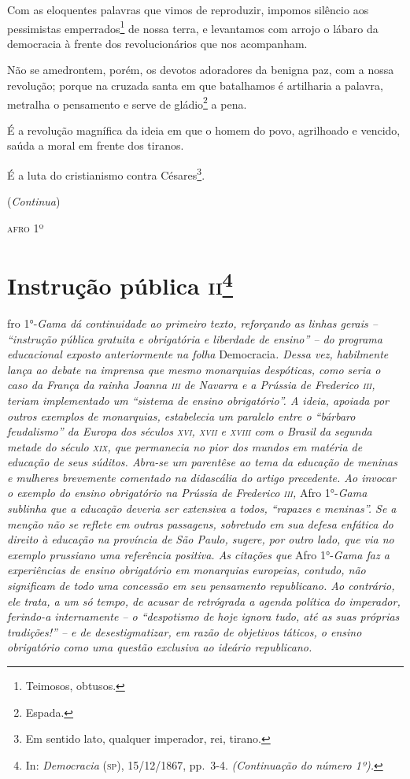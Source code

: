Com as eloquentes palavras que vimos de reproduzir, impomos silêncio aos
pessimistas emperrados\footnote{Teimosos, obtusos.} de nossa terra, e
levantamos com arrojo o lábaro da democracia à frente dos
revolucionários que nos acompanham.

Não se amedrontem, porém, os devotos adoradores da benigna paz, com a
nossa revolução; porque na cruzada santa em que batalhamos é artilharia
a palavra, metralha o pensamento e serve de gládio\footnote{Espada.} a
pena.

É a revolução magnífica da ideia em que o homem do povo, agrilhoado e
vencido, saúda a moral em frente dos tiranos.

É a luta do cristianismo contra Césares\footnote{Em sentido lato,
  qualquer imperador, rei, tirano.}.

(\emph{Continua})
\begin{flushright}
\textsc{afro} 1º
\end{flushright}
\chapter{Instrução pública \textsc{ii}\footnote{In: \emph{Democracia} (\textsc{sp}),
  15/12/1867, pp.~3-4. \emph{(Continuação do número 1º).}}}

\begin{didascalia}
fro 1°-\emph{Gama dá continuidade ao primeiro texto, reforçando as
linhas gerais -- ``instrução pública gratuita e obrigatória e liberdade
de ensino'' -- do programa educacional exposto anteriormente na folha}
Democracia\emph{. Dessa vez, habilmente lança ao debate na imprensa que
mesmo monarquias despóticas, como seria o caso da França da rainha
Joanna \textsc{iii} de Navarra e a Prússia de Frederico \textsc{iii}, teriam implementado
um ``sistema de ensino obrigatório''. A ideia, apoiada por outros exemplos
de monarquias, estabelecia um paralelo entre o ``bárbaro feudalismo'' da
Europa dos séculos \textsc{xvi}, \textsc{xvii} e \textsc{xviii} com o Brasil da segunda metade do
século \textsc{xix}, que permanecia no pior dos mundos em matéria de educação de
seus súditos. Abra-se um parentêse ao tema da educação de meninas e
mulheres brevemente comentado na didascália do artigo precedente. Ao
invocar o exemplo do ensino obrigatório na Prússia de Frederico \textsc{iii},}
Afro 1°-\emph{Gama sublinha que a educação deveria ser extensiva a
todos, ``rapazes e meninas''. Se a menção não se reflete em outras
passagens, sobretudo em sua defesa enfática do direito à educação na
província de São Paulo, sugere, por outro lado, que via no exemplo
prussiano uma referência positiva. As citações que} Afro 1°-\emph{Gama
faz a experiências de ensino obrigatório em monarquias europeias,
contudo, não significam de todo uma concessão em seu pensamento
republicano. Ao contrário, ele trata, a um só tempo, de acusar de
retrógrada a agenda política do imperador, ferindo-a internamente -- o
``despotismo de hoje ignora tudo, até as suas próprias tradições!'' -- e
de desestigmatizar, em razão de objetivos táticos, o ensino obrigatório
como uma questão exclusiva ao ideário republicano.}
\end{didascalia}



